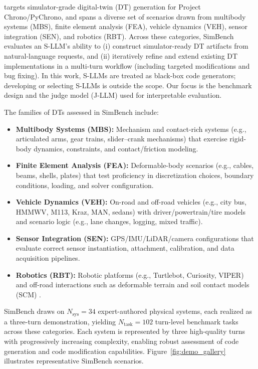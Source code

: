  targets simulator-grade digital-twin (DT) generation for Project Chrono/PyChrono, and spans a diverse set of scenarios drawn from multibody systems (MBS), finite element analysis (FEA), vehicle dynamics (VEH), sensor integration (SEN), and robotics (RBT). 
Across these categories, SimBench evaluates an S-LLM’s ability to (i) construct simulator-ready DT artifacts from natural-language requests, and (ii) iteratively refine and extend existing DT implementations in a multi-turn workflow (including targeted modifications and bug fixing). 
In this work, S-LLMs are treated as black-box code generators; developing or selecting S-LLMs is outside the scope. Our focus is the benchmark design and the judge model (J-LLM) used for interpretable evaluation.

\vspace{2pt}
\noindent The families of DTs assessed in SimBench include:
\begin{itemize}
    \item \textbf{Multibody Systems (MBS):} Mechanism and contact-rich systems (e.g., articulated arms, gear trains, slider--crank mechanisms) that exercise rigid-body dynamics, constraints, and contact/friction modeling.
    \item \textbf{Finite Element Analysis (FEA):} Deformable-body scenarios (e.g., cables, beams, shells, plates) that test proficiency in discretization choices, boundary conditions, loading, and solver configuration.
    \item \textbf{Vehicle Dynamics (VEH):} On-road and off-road vehicles (e.g., city bus, HMMWV, M113, Kraz, MAN, sedans) with driver/powertrain/tire models and scenario logic (e.g., lane changes, logging, mixed traffic).
    \item \textbf{Sensor Integration (SEN):} GPS/IMU/LiDAR/camera configurations that evaluate correct sensor instantiation, attachment, calibration, and data acquisition pipelines.
    \item \textbf{Robotics (RBT):} Robotic platforms (e.g., Turtlebot, Curiosity, VIPER) and off-road interactions such as deformable terrain and soil contact models (SCM) \cite{Krenn2011}.
\end{itemize}
SimBench draws on $N_{\text{sys}}=34$ expert-authored physical systems, each realized as a three-turn demonstration, yielding $N_{\text{task}}=102$ turn-level benchmark tasks across these categories. Each system is represented by three high-quality turns with progressively increasing complexity, enabling robust assessment of code generation and code modification capabilities. Figure~\ref{fig:demo_gallery} illustrates representative SimBench scenarios.

